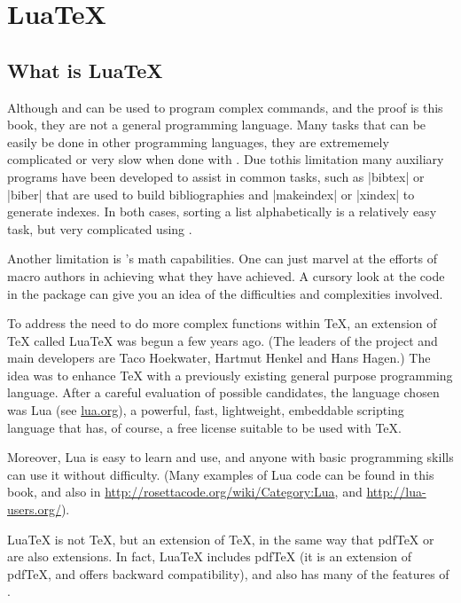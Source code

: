 \chapter{LuaTeX}
\section{What is LuaTeX}

Although \tex and \latex can be used to program complex commands, and the proof is this book, they are not a general programming language. Many tasks that can be easily be done
in other programming languages, they are extrememely complicated or very slow when done with \tex. Due tothis limitation many auxiliary programs have been developed to assist in common tasks, such as |bibtex| or |biber| that are used to build bibliographies and |makeindex| or |xindex| to generate indexes. In both cases, sorting a list alphabetically is a relatively easy task, but very complicated using \tex.


Another limitation is \tex's math capabilities. One can just marvel at the efforts of \tex macro authors in achieving what they have achieved. A cursory look at the code in the  package \cite{fp} can give you an idea of the difficulties and complexities involved.

To address the need to do more complex functions within \TeX, an extension of \TeX{} called Lua\TeX{} was begun a few years ago.  
(The leaders of the project and main developers are Taco Hoekwater, Hartmut Henkel and Hans Hagen.) The idea was to enhance \TeX{} with a previously existing general purpose programming language. After a careful evaluation of possible candidates, the language chosen was Lua (see \href{http://www.lua.org/}{lua.org}), a powerful, fast, lightweight, embeddable scripting language that has,  of course, a free license suitable to be used with \TeX.

Moreover, Lua is easy to learn and use, and anyone with basic programming skills can use it without difficulty. (Many examples of Lua code can be found in this book, and also in \url{http://rosettacode.org/wiki/Category:Lua},
and \url{http://lua-users.org/}).

Lua\TeX{} is not \TeX{}, but an extension of \TeX{}, in the same way that pdf\TeX{} or \XeTeX{} are also extensions.
In fact, Lua\TeX{} includes pdf\TeX{} (it is an extension of pdf\TeX{}, and offers backward compatibility), 
and also has many of the features of \XeTeX.

